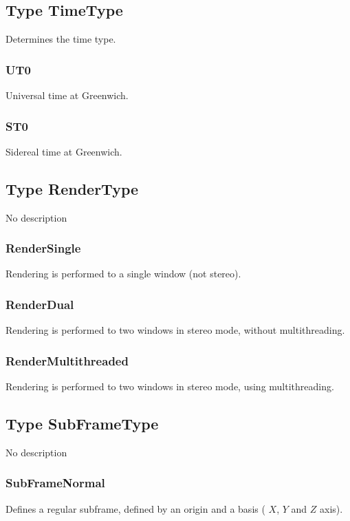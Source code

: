 \documentclass[10pt]{book}
\begin{document}
\subsection{Type TimeType \label{T:TimeType}}
Determines the time type.

\subsubsection{UT0 \label{T:TimeType|UT0}}
Universal time at Greenwich.

\subsubsection{ST0 \label{T:TimeType|ST0}}
Sidereal time at Greenwich.

\subsection{Type RenderType \label{T:RenderType}}
No description

\subsubsection{RenderSingle \label{T:RenderType|RenderSingle}}
Rendering is performed to a single window (not stereo).

\subsubsection{RenderDual \label{T:RenderType|RenderDual}}
Rendering is performed to two windows in stereo mode, without multithreading.

\subsubsection{RenderMultithreaded \label{T:RenderType|RenderMultithreaded}}
Rendering is performed to two windows in stereo mode, using multithreading.

\subsection{Type SubFrameType \label{T:SubFrameType}}
No description

\subsubsection{SubFrameNormal \label{T:SubFrameType|SubFrameNormal}}
Defines a regular subframe, defined by an origin and a basis ( $X$, $Y$ and $Z$ axis).
\end{document}
